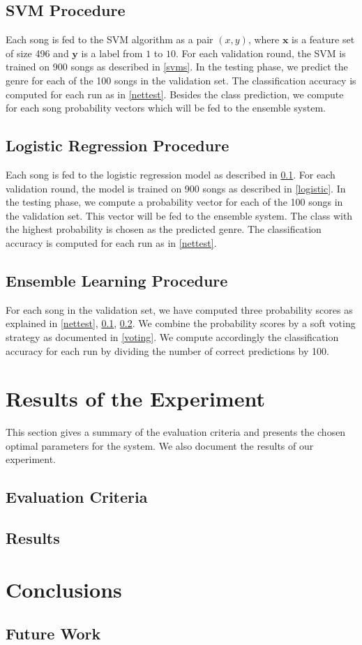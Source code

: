 \documentclass[a4paper,11pt,oneside]{article}
\begin{document}
\subsection{SVM Procedure}\label{svmproc}
Each song is fed to the SVM algorithm as a pair $(x,y)$, where $\mathbf{x}$ is a feature set of size 496 
and $\mathbf{y}$ is a label from $1$ to $10$. For each validation round, the SVM is trained on 900 songs
as described in \ref{svms}. In the testing phase, we predict the genre for each of the 100 songs in the validation set.
The classification accuracy is computed for each run as in \ref{nettest}. Besides the class prediction, we compute
for each song probability vectors which will be fed to the ensemble system.
\subsection{Logistic Regression Procedure}\label{logproc}
Each song is fed to the logistic regression model as described in \ref{svmproc}. For each validation round, 
the model is trained on 900 songs as described in \ref{logistic}. In the testing phase, we compute a probability 
vector for each of the 100 songs in the validation set. This vector will be fed to the ensemble system. The class
with the highest probability is chosen as the predicted genre. The classification accuracy is computed for each run
as in \ref{nettest}.
\subsection{Ensemble Learning Procedure}
For each song in the validation set, we have computed three probability scores as explained in \ref{nettest},
\ref{svmproc}, \ref{logproc}.
We combine the probability scores by a soft voting strategy as documented in \ref{voting}. We compute accordingly
the classification accuracy for each run by dividing the number of correct predictions by 100.
\section{Results of the Experiment}
This section gives a summary of the evaluation criteria and presents the chosen optimal parameters for the system.
We also document the results of our experiment.
\subsection{Evaluation Criteria}
\subsection{Results}
\section{Conclusions}
\subsection{Future Work}
\nocite{*}
\newpage


\end{document}
